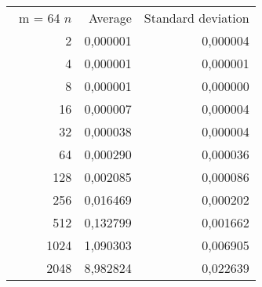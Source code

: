 \begin{tabular}{rrr}\
m = 64
 $n$ & Average & Standard deviation  \\
2 &  0,000001 &  0,000004 \\ 
4 &  0,000001 &  0,000001 \\ 
8 &  0,000001 &  0,000000 \\ 
16 &  0,000007 &  0,000004 \\ 
32 &  0,000038 &  0,000004 \\ 
64 &  0,000290 &  0,000036 \\ 
128 &  0,002085 &  0,000086 \\ 
256 &  0,016469 &  0,000202 \\ 
512 &  0,132799 &  0,001662 \\ 
1024 &  1,090303 &  0,006905 \\ 
2048 &  8,982824 &  0,022639 \\ 
\end{tabular}
